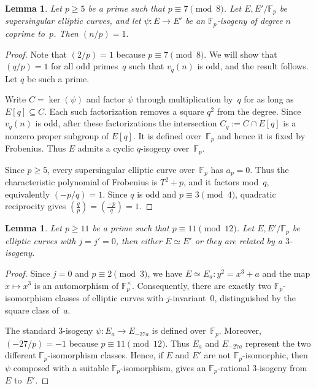 \documentclass[12pt]{amsart}
\numberwithin{equation}{section}
\newtheorem{lemma}[equation]{Lemma}
\theoremstyle{definition}
\newcommand{\F}{\mathbb{F}}
\begin{document}
\begin{lemma}\label{lem:ss-isogeny-degree}
Let $p\geq5$ be a prime such that $p\equiv7\pmod8$.  Let
$E, E'/\F_p$ be supersingular elliptic curves, and let
$\psi: E\rightarrow E'$ be an $\F_p$-isogeny of
degree $n$ coprime to~$p$.  Then
\(
 ({n}/{p})=1.
\)
\end{lemma}
\begin{proof}

Note that $(2/p)=1$ because $p\equiv7\pmod8$. We will show that $(q/p) = 1$
for all odd primes~$q$ such that $v_q(n)$ is odd, and the result follows.  
Let $q$ be such a prime.

Write
$C=\ker(\psi)$ and factor $\psi$ through multiplication by~$q$ for as
long as $ E[q]\subseteq C$.  Each such factorization removes
a square $q^2$ from the degree.  Since $v_q(n)$ is odd, after these
factorizations the intersection $C_q:=C\cap E[q]$ is a nonzero
proper subgroup of $ E[q]$.  It is defined over~$\F_p$ and
hence it is fixed by Frobenius. Thus $E$ admits a cyclic $q$-isogeny over~$\F_p$.

Since $p\geq5$, every supersingular elliptic curve over~$\F_p$ has $a_p=0$. Thus the characteristic polynomial of Frobenius is $T^2+p$, and it factors mod~$q$, equivalently $ 
(-p/q)=1$.
Since $q$ is odd and $p\equiv3\pmod4$, quadratic reciprocity gives
\(
 \left(\frac{q}{p}\right)
 =
 \left(\frac{-p}{q}\right)
 =1.
\)
\end{proof}

\begin{lemma}\label{lem:ss-isogeny-degree2}
Let $p\geq11$ be a prime such that $p\equiv11\pmod{12}$.  Let
$E, E'/\F_p$ be elliptic curves with $j=j'=0$, then either $E\simeq E'$ or they are related by a $3$-isogeny.
\end{lemma}
\begin{proof}
Since $j=0$ and $p\equiv2\pmod3$, we have $E\simeq E_a:y^2=x^3+a$ and the map $x\mapsto x^3$ is an automorphism of
$\F_p^\times$. Consequently, there are exactly two $\F_p$-isomorphism
classes of elliptic curves with $j$-invariant~$0$, distinguished by
the square class of~$a$.

The standard $3$-isogeny
\(
\psi : E_a
\to
E_{-27a}
\)
is defined over~$\F_p$. Moreover, $(-27/p)=-1$
because $p\equiv11\pmod{12}$. Thus $E_a$ and $E_{-27a}$ represent the
two different $\F_p$-isomorphism classes. Hence, if $E$ and $E'$ are
not $\F_p$-isomorphic, then $\psi$ composed with a
suitable $\F_p$-isomorphism, gives an $\F_p$-rational $3$-isogeny
from $E$ to~$E'$.
\end{proof}
\end{document}

